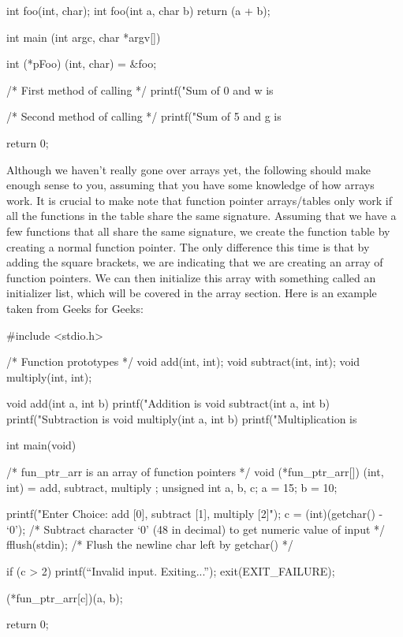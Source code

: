 \documentclass{article}
\begin{document}
\begin{cblk}
int foo(int, char);
int foo(int a, char b) {
   return (a + b);
}

int main (int argc, char *argv[]) {

   int (*pFoo) (int, char) = &foo;

   /* First method of calling */
   printf("Sum of 0 and w is %

   /* Second method of calling */
   printf("Sum of 5 and g is %

   return 0;
}
\end{cblk}

Although we haven’t really gone over arrays yet, the following should make enough sense to you, assuming that
you have some knowledge of how arrays work. It is crucial to make note that function pointer arrays/tables
only work if all the functions in the table share the same signature. Assuming that we have a few functions
that all share the same signature, we create the function table by creating a normal function pointer. The
only difference this time is that by adding the square brackets, we are indicating that we are creating an
array of function pointers. We can then initialize this array with something called an initializer list,
which will be covered in the array section. Here is an example taken from Geeks for Geeks:

\begin{cblk}
#include <stdio.h>

/* Function prototypes */
void add(int, int);
void subtract(int, int);
void multiply(int, int);

void add(int a, int b) {
    printf("Addition is %
}
void subtract(int a, int b) {
    printf("Subtraction is %
}
void multiply(int a, int b)  {
    printf("Multiplication is %
}

int main(void)
{
    /* fun_ptr_arr is an array of function pointers */
    void (*fun_ptr_arr[]) (int, int) = { add, subtract, multiply };
    unsigned int a, b, c;
    a = 15;
    b = 10;

    printf("Enter Choice: add [0], subtract [1], multiply [2]\n");
    c = (int)(getchar() - ‘0’); /* Subtract character ‘0’ (48 in decimal) to get numeric value of input */
    fflush(stdin); /* Flush the newline char left by getchar() */

    if (c > 2) {
	printf(“Invalid input. Exiting...”);
	exit(EXIT_FAILURE);
    }

    (*fun_ptr_arr[c])(a, b);

    return 0;
}
\end{cblk}
\end{document}
